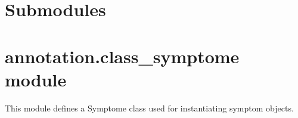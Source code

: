 \documentclass[letterpaper,10pt,english]{sphinxmanual}
\begin{document}
\section{Submodules}
\label{\detokenize{annotation:submodules}}

\section{annotation.class\_symptome module}
\label{\detokenize{annotation:module-annotation.class_symptome}}\label{\detokenize{annotation:annotation-class-symptome-module}}
\sphinxAtStartPar
This module defines a Symptome class used for instantiating symptom objects.
\end{document}
